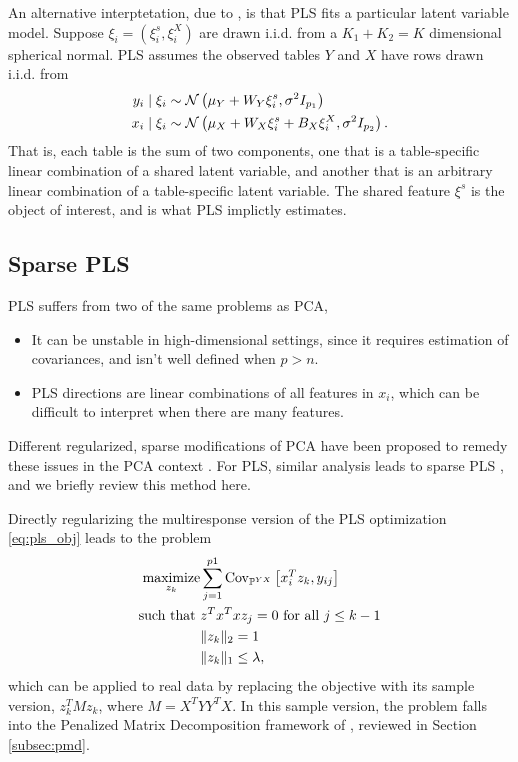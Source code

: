 \documentclass{article}
\begin{document}
An alternative interptetation, due to \citep{gustafsson2001probabilistic}, is
that PLS fits a particular latent variable model. Suppose $\xi_{i} =
\left(\xi_{i}^{s}, \xi_{i}^{X}\right)$ are drawn i.i.d. from a $K_{1} + K_{2} =
K$ dimensional spherical normal. PLS assumes the observed tables $Y$ and $X$
have rows drawn i.i.d. from
\begin{align*}
y_{i} \mid \xi_{i} &\sim \mathcal{N}\left(\mu_Y + W_{Y}\xi_{i}^{s}, \sigma^{2}I_{p_{1}}\right) \\
x_{i} \mid \xi_{i} &\sim \mathcal{N}\left(\mu_{X} + W_{X} \xi_{i}^{s} + B_{X}\xi_{i}^{X}, \sigma^{2}I_{p_{2}}\right).
\end{align*}
That is, each table is the sum of two components, one that is a
table-specific linear combination of a shared latent variable, and
another that is an arbitrary linear combination of a table-specific
latent variable. The shared feature $\xi^{s}$ is the object of
interest, and is what PLS implictly estimates.

\subsection{Sparse PLS}
\label{subsec:spls}

PLS suffers from two of the same problems as PCA,
\begin{itemize}
\item It can be unstable in high-dimensional settings, since it requires
  estimation of covariances, and isn't well defined when $p > n$.
\item PLS directions are linear combinations of all features in $x_i$, which can
  be difficult to interpret when there are many features.
\end{itemize}

Different regularized, sparse modifications of PCA have been proposed to remedy
these issues in the PCA context \citep{jolliffe2003modified, zou2006sparse,
  witten2009penalized}. For PLS, similar analysis leads to sparse PLS
\citep{le2008sparse, chun2010sparse}, and we briefly review this method here.

Directly regularizing the multiresponse version of the PLS optimization
\ref{eq:pls_obj} leads to the problem
\begin{align*}
  \mathop\mathrm{maximize}_{z_k} &\sum_{j = 1}^{p1} \mathrm{Cov}_{\mathbb{P}^{YX}}\left[{x_i^T z_k, y_{ij}}\right] \\
  \text{such that }&z^{T}x^{T}x z_{j} = 0 \text{ for all }j \leq k - 1 \\
  &\|z_k\|_2 = 1 \\
  &\|z_k\|_1 \leq \lambda,
\end{align*}
which can be applied to real data by replacing the objective with its sample
version, $z_k^{T} M z_k$, where $M = X^{T}YY^{T}X$. In this sample version, the
problem falls into the Penalized Matrix Decomposition framework of
\citep{witten2009penalized}, reviewed in Section \ref{subsec:pmd}.
\end{document}
